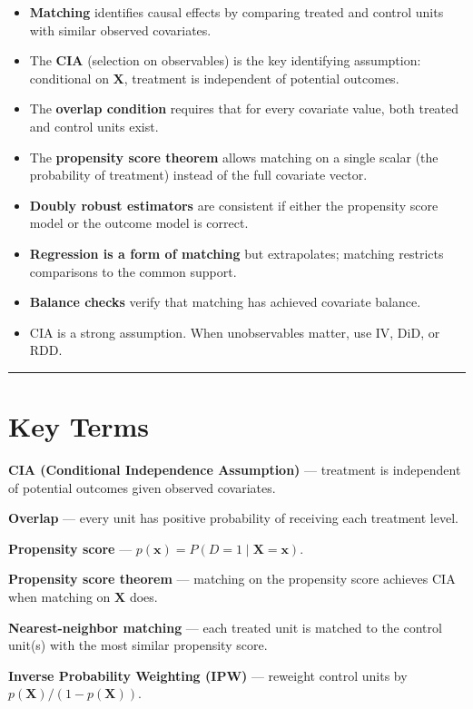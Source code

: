 \begin{itemize}
\item \textbf{Matching} identifies causal effects by comparing treated and control units with similar observed covariates.
\item The \textbf{CIA} (selection on observables) is the key identifying assumption: conditional on $\mathbf{X}$, treatment is independent of potential outcomes.
\item The \textbf{overlap condition} requires that for every covariate value, both treated and control units exist.
\item The \textbf{propensity score theorem} allows matching on a single scalar (the probability of treatment) instead of the full covariate vector.
\item \textbf{Doubly robust estimators} are consistent if either the propensity score model or the outcome model is correct.
\item \textbf{Regression is a form of matching} but extrapolates; matching restricts comparisons to the common support.
\item \textbf{Balance checks} verify that matching has achieved covariate balance.
\item CIA is a strong assumption. When unobservables matter, use IV, DiD, or RDD.
\end{itemize}

\medskip\hrule\medskip

\section{Key Terms}

\textbf{CIA (Conditional Independence Assumption)} --- treatment is independent of potential outcomes given observed covariates.

\textbf{Overlap} --- every unit has positive probability of receiving each treatment level.

\textbf{Propensity score} --- $p(\mathbf{x}) = P(D=1 \mid \mathbf{X}=\mathbf{x})$.

\textbf{Propensity score theorem} --- matching on the propensity score achieves CIA when matching on $\mathbf{X}$ does.

\textbf{Nearest-neighbor matching} --- each treated unit is matched to the control unit(s) with the most similar propensity score.

\textbf{Inverse Probability Weighting (IPW)} --- reweight control units by $p(\mathbf{X})/(1-p(\mathbf{X}))$.

